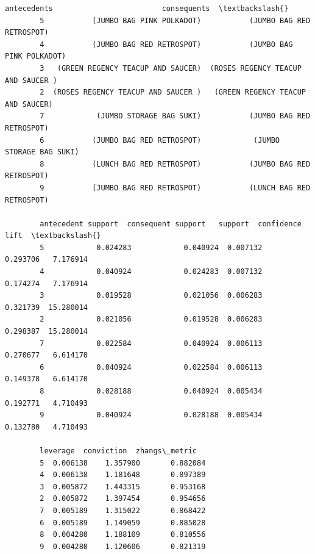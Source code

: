 \documentclass[11pt]{article}
\makeatletter
\newcommand{\boxspacing}{\kern\kvtcb@left@rule\kern\kvtcb@boxsep}
\newcommand{\prompt}[4]{
        {\ttfamily\llap{{\color{#2}[#3]:\hspace{3pt}#4}}\vspace{-\baselineskip}}
    }
\makeatother
\begin{document}
\begin{tcolorbox}[breakable, size=fbox, boxrule=.5pt, pad at break*=1mm, opacityfill=0]
    \prompt{Out}{outcolor}{19}{\boxspacing}
    \begin{Verbatim}[commandchars=\\\{\}]
        antecedents                         consequents  \textbackslash{}
        5           (JUMBO BAG PINK POLKADOT)           (JUMBO BAG RED RETROSPOT)
        4           (JUMBO BAG RED RETROSPOT)           (JUMBO BAG PINK POLKADOT)
        3   (GREEN REGENCY TEACUP AND SAUCER)  (ROSES REGENCY TEACUP AND SAUCER )
        2  (ROSES REGENCY TEACUP AND SAUCER )   (GREEN REGENCY TEACUP AND SAUCER)
        7            (JUMBO STORAGE BAG SUKI)           (JUMBO BAG RED RETROSPOT)
        6           (JUMBO BAG RED RETROSPOT)            (JUMBO STORAGE BAG SUKI)
        8           (LUNCH BAG RED RETROSPOT)           (JUMBO BAG RED RETROSPOT)
        9           (JUMBO BAG RED RETROSPOT)           (LUNCH BAG RED RETROSPOT)

        antecedent support  consequent support   support  confidence       lift  \textbackslash{}
        5            0.024283            0.040924  0.007132    0.293706   7.176914
        4            0.040924            0.024283  0.007132    0.174274   7.176914
        3            0.019528            0.021056  0.006283    0.321739  15.280014
        2            0.021056            0.019528  0.006283    0.298387  15.280014
        7            0.022584            0.040924  0.006113    0.270677   6.614170
        6            0.040924            0.022584  0.006113    0.149378   6.614170
        8            0.028188            0.040924  0.005434    0.192771   4.710493
        9            0.040924            0.028188  0.005434    0.132780   4.710493

        leverage  conviction  zhangs\_metric
        5  0.006138    1.357900       0.882084
        4  0.006138    1.181648       0.897389
        3  0.005872    1.443315       0.953168
        2  0.005872    1.397454       0.954656
        7  0.005189    1.315022       0.868422
        6  0.005189    1.149059       0.885028
        8  0.004280    1.188109       0.810556
        9  0.004280    1.120606       0.821319
    \end{Verbatim}
\end{tcolorbox}


\end{document}
